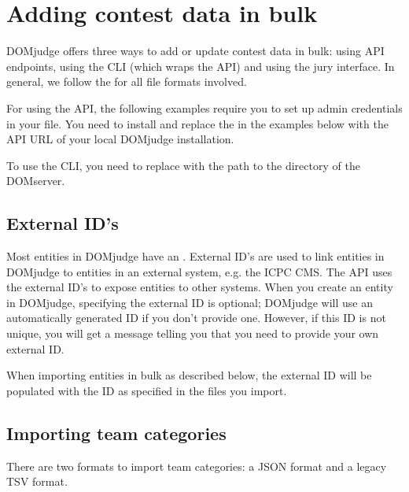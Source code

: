 \documentclass[a4paper,10pt,english,openany]{sphinxmanual}
\begin{document}
\section{Adding contest data in bulk}
\label{\detokenize{import:adding-contest-data-in-bulk}}\label{\detokenize{import::doc}}
\sphinxAtStartPar
DOMjudge offers three ways to add or update contest data in bulk: using API
endpoints, using the CLI (which wraps the API) and using the jury interface.
In general, we follow the  for all file formats involved.

\sphinxAtStartPar
For using the API, the following examples require you to set up admin credentials
in your  file. You need to install  and replace the
 in the examples below with the API URL of your local DOMjudge
installation.

\sphinxAtStartPar
To use the CLI, you need to replace  with the path to
the  directory of the DOMserver.


\subsection{External ID’s}
\label{\detokenize{import:external-id-s}}\label{\detokenize{import:external-ids}}
\sphinxAtStartPar
Most entities in DOMjudge have an . External ID’s are used to link
entities in DOMjudge to entities in an external system, e.g. the ICPC CMS. The
API uses the external ID’s to expose entities to other systems. When you create
an entity in DOMjudge, specifying the external ID is optional; DOMjudge will
use an automatically generated ID if you don’t provide one. However, if this ID
is not unique, you will get a message telling you that you need to provide your
own external ID.

\sphinxAtStartPar
When importing entities in bulk as described below, the external ID will be
populated with the ID as specified in the files you import.


\subsection{Importing team categories}
\label{\detokenize{import:importing-team-categories}}
\sphinxAtStartPar
There are two formats to import team categories: a JSON format and a legacy TSV format.
\end{document}
